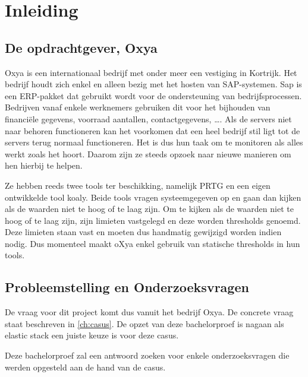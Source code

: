 
\chapter{Inleiding}
\label{ch:inleiding}

\section{De opdrachtgever, Oxya}
\label{sec:de-opdrachtgever}

Oxya is een internationaal bedrijf met onder meer een vestiging in Kortrijk. Het bedrijf houdt zich enkel en alleen bezig met het hosten van SAP-systemen. Sap is een ERP-pakket dat gebruikt wordt voor de ondersteuning van bedrijfsprocessen. Bedrijven vanaf enkele werknemers gebruiken dit voor het bijhouden van financiële gegevens, voorraad aantallen, contactgegevens, \dots. Als de servers niet naar behoren functioneren kan het voorkomen dat een heel bedrijf stil ligt tot de servers terug normaal functioneren. Het is dus hun taak om te monitoren als alles werkt zoals het hoort. Daarom zijn ze steeds opzoek naar nieuwe manieren om hen hierbij te helpen.

Ze hebben reeds twee tools ter beschikking, namelijk PRTG en een eigen ontwikkelde tool koaly. Beide tools vragen systeemgegeven op en gaan dan kijken als de waarden niet te hoog of te laag zijn. Om te kijken als de waarden niet te hoog of te laag zijn, zijn limieten vastgelegd en deze worden thresholds genoemd. Deze limieten staan vast en moeten dus handmatig gewijzigd worden indien nodig. Dus momenteel maakt oXya enkel gebruik van statische thresholds in hun tools.

\section{Probleemstelling en Onderzoeksvragen}
\label{sec:onderzoeksvragen}

De vraag voor dit project komt dus vanuit het bedrijf Oxya. De concrete vraag staat beschreven in \ref{ch:casus}. De opzet van deze bachelorproef is nagaan als elastic stack een juiste keuze is voor deze casus.  

Deze bachelorproef zal een antwoord zoeken voor enkele onderzoeksvragen die werden opgesteld aan de hand van de casus.


